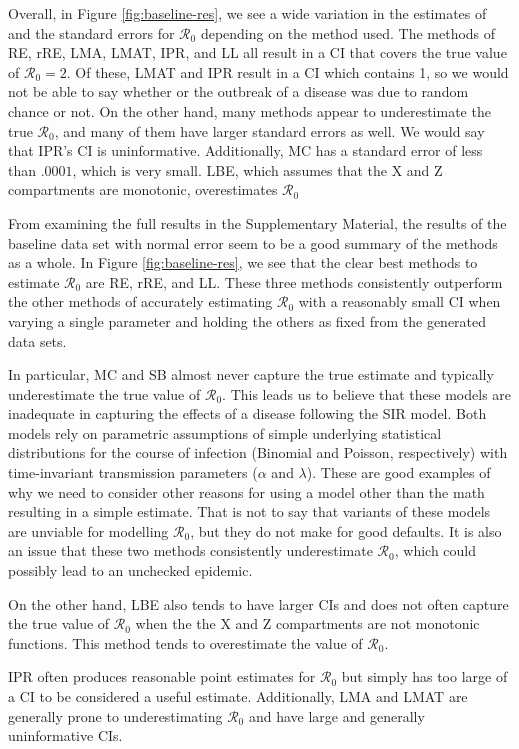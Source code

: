 \documentclass[12pt]{article}
\newcommand{\rr}{\ensuremath{\mathcal{R}_0}}
\begin{document}
Overall, in Figure \ref{fig:baseline-res}, we see a wide variation in the estimates of and the standard errors for $\rr$ depending on the method used.  The methods of RE, rRE, LMA, LMAT, IPR, and LL all result in a CI that covers the true value of $\rr=2$.  Of these, LMAT and IPR result in a CI which contains 1, so we would not be able to say whether or the outbreak of a disease was due to random chance or not. On the other hand, many methods appear to underestimate the true $\rr$, and many of them have larger standard errors as well.  We would say that IPR's CI is uninformative. Additionally, MC has a standard error of less than $.0001$, which is very small.  LBE, which assumes that the X and Z compartments are monotonic, overestimates $\rr$

From examining the full results in the Supplementary Material, the results of the baseline data set with normal error seem to be a good summary of the methods as a whole.  In Figure \ref{fig:baseline-res}, we see that the clear best methods to estimate $\rr$ are RE, rRE, and LL.  These three methods consistently outperform the other methods of accurately estimating $\rr$ with a reasonably small CI when varying a single parameter and holding the others as fixed from the generated data sets.

In particular, MC and SB almost never capture the true estimate and typically underestimate the true value of $\rr$.  This leads us to believe that these models are inadequate in capturing the effects of a disease following the SIR model.  Both models rely on parametric assumptions of simple underlying statistical distributions for the course of infection (Binomial and Poisson, respectively) with time-invariant transmission parameters ($\alpha$ and $\lambda$).  These are good examples of why we need to consider other reasons for using a model other than the math resulting in a simple estimate.  That is not to say that variants of these models are unviable for modelling $\rr$, but they do not make for good defaults.  It is also an issue that these two methods consistently underestimate $\rr$, which could possibly lead to an unchecked epidemic.

On the other hand, LBE also tends to have larger CIs and does not often capture the true value of $\rr$ when the the X and Z compartments are not monotonic functions.  This method tends to overestimate the value of $\rr$.

IPR often produces reasonable point estimates for $\rr$ but simply has too large of a CI to be considered a useful estimate.    Additionally, LMA and LMAT are generally prone to underestimating $\rr$ and have large and generally uninformative CIs.
\end{document}
